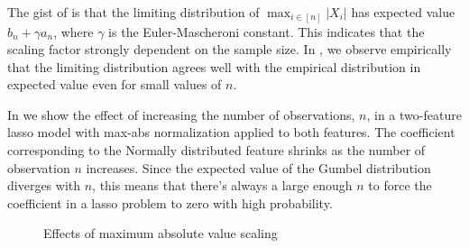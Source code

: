 The gist of  is that the limiting distribution of \(\max_{i \in
  [n]}|X_i|\) has expected value \(b_n + \gamma a_n\), where \(\gamma\) is the
Euler-Mascheroni constant. This indicates that the scaling factor strongly dependent on the
sample size. In , we observe empirically that the limiting
distribution agrees well with the empirical distribution in expected value even for small
values of \(n\).

In  we show the effect of increasing the number of observations, \(n\),
in a two-feature lasso model with max-abs normalization applied to both features. The
coefficient corresponding to the Normally distributed feature shrinks as the number of
observation \(n\) increases. Since the expected value of the Gumbel distribution diverges
with \(n\), this means that there's always a large enough \(n\) to force the coefficient in
a lasso problem to zero with high probability.

\begin{figure}[htpb]
  \centering
  \hspace{1cm}
  \caption{%
    Effects of maximum absolute value scaling
  }
\end{figure}

